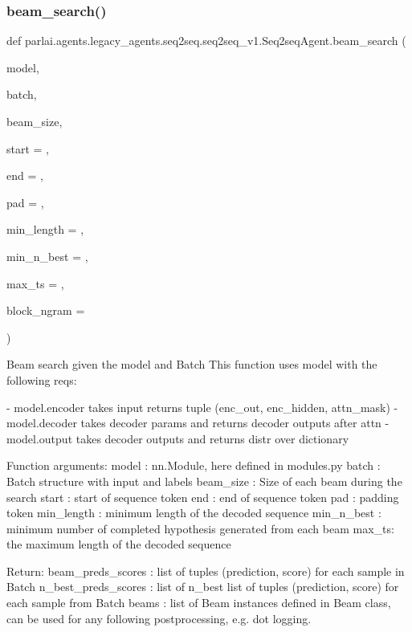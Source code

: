 \subsubsection{\texorpdfstring{beam\+\_\+search()}{beam\_search()}}
{\footnotesize\ttfamily def parlai.\+agents.\+legacy\+\_\+agents.\+seq2seq.\+seq2seq\+\_\+v1.\+Seq2seq\+Agent.\+beam\+\_\+search (\begin{DoxyParamCaption}\item[{}]{model,  }\item[{}]{batch,  }\item[{}]{beam\+\_\+size,  }\item[{}]{start = {},  }\item[{}]{end = {},  }\item[{}]{pad = {},  }\item[{}]{min\+\_\+length = {},  }\item[{}]{min\+\_\+n\+\_\+best = {},  }\item[{}]{max\+\_\+ts = {},  }\item[{}]{block\+\_\+ngram = {} }\end{DoxyParamCaption})\hspace{0.3cm}{\ttfamily [static]}}

\begin{DoxyVerb}Beam search given the model and Batch This function uses model with the
following reqs:

- model.encoder takes input returns tuple (enc_out, enc_hidden, attn_mask)
- model.decoder takes decoder params and returns decoder outputs after attn
- model.output takes decoder outputs and returns distr over dictionary

Function arguments:
model : nn.Module, here defined in modules.py
batch : Batch structure with input and labels
beam_size : Size of each beam during the search
start : start of sequence token
end : end of sequence token
pad : padding token
min_length : minimum length of the decoded sequence
min_n_best : minimum number of completed hypothesis generated from each beam
max_ts: the maximum length of the decoded sequence

Return:
beam_preds_scores : list of tuples (prediction, score) for each sample in Batch
n_best_preds_scores : list of n_best list of tuples (prediction, score) for
              each sample from Batch
beams : list of Beam instances defined in Beam class, can be used for any
following postprocessing, e.g. dot logging.
\end{DoxyVerb}
 

